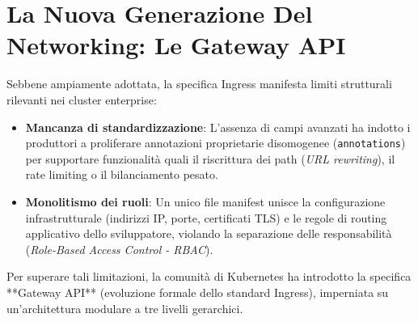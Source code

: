 \documentclass[11pt, a4paper]{article}
\begin{document}
\newpage


\section{La Nuova Generazione Del Networking: Le Gateway API}

Sebbene ampiamente adottata, la specifica Ingress manifesta limiti strutturali rilevanti nei cluster enterprise:
\begin{itemize}[noitemsep]
    \item \textbf{Mancanza di standardizzazione}: L'assenza di campi avanzati ha indotto i produttori a proliferare annotazioni proprietarie disomogenee (\texttt{annotations}) per supportare funzionalità quali il riscrittura dei path (\emph{URL rewriting}), il rate limiting o il bilanciamento pesato.
    \item \textbf{Monolitismo dei ruoli}: Un unico file manifest unisce la configurazione infrastrutturale (indirizzi IP, porte, certificati TLS) e le regole di routing applicativo dello sviluppatore, violando la separazione delle responsabilità (\emph{Role-Based Access Control - RBAC}).
\end{itemize}

Per superare tali limitazioni, la comunità di Kubernetes ha introdotto la specifica **Gateway API** (evoluzione formale dello standard Ingress), imperniata su un'architettura modulare a tre livelli gerarchici.

\end{document}
